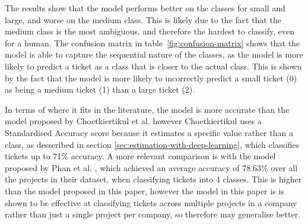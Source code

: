 \documentclass{UoYCSproject}
\begin{document}
    The results show that the model performs better on the classes for small and large, and worse on the medium class.
    This is likely due to the fact that the medium class is the most ambiguous, and therefore the hardest to classify, even for a human.
    The confusion matrix in table~\ref{fig:confusion-matrix} shows that the model is able to capture the sequential nature of the classes, as the model is more likely to predict a ticket as a class that is closer to the actual class.
    This is shown by the fact that the model is more likely to incorrectly predict a small ticket (0) as being a medium ticket (1) than a large ticket (2).

    In terms of where it fits in the literature, the model is more accurate than the model proposed by Choetkiertikul et al. \cite{8255666} however Choetkiertikul uses a Standardised Accuracy score because it estimates a specific value rather than a class, as desscribed in section \ref{sec:estimation-with-deep-learning}, which classifies tickets up to 71\% accuracy.
    A more relevant comparison is with the model proposed by Phan et al. \cite{phan2022story}, which achieved an average accuracy of 78.63\% over all the projects in their dataset, when classifying tickets into 4 classes.
    This is higher than the model proposed in this paper, however the model in this paper is is shown to be effective at classifying tickets across multiple projects in a company rather than just a single project per company, so therefore may generalise better.
\end{document}
